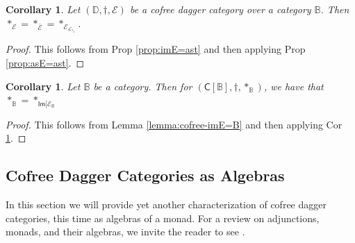 \documentclass[10pt]{article}
\newtheorem{corollary}[observation]{Corollary}
\begin{document}
\begin{corollary}\label{cor:astE=3} Let $(\mathbb{D},\dagger, \mathcal{E})$ be a cofree dagger category over a category $\mathbb{B}$. Then $\ast_\mathcal{E} = \ast_{\overline{\mathcal{E}}} = \ast_{\mathcal{E}_{\mathcal{L}_{\ast_\mathcal{E}}}}$. 
\end{corollary}
\begin{proof} This follows from Prop \ref{prop:imE=ast} and then applying Prop \ref{prop:asE=ast}. 
\end{proof}

\begin{corollary}\label{cor:astE=3-canon} Let $\mathbb{B}$ be a category. Then for $(\mathsf{C}[\mathbb{B}], \dagger, \ast_\mathbb{B})$, we have that $\ast_\mathbb{B} = \ast_{\mathsf{Im}[\mathcal{E}_\mathbb{B}}$
\end{corollary}
\begin{proof} This follows from Lemma \ref{lemma:cofree-imE=B} and then applying Cor \ref{cor:astE=3}. 
\end{proof}

\subsection{Cofree Dagger Categories as Algebras}\label{sec:alg}

In this section we will provide yet another characterization of cofree dagger categories, this time as algebras of a monad. For a review on adjunctions, monads, and their algebras, we invite the reader to see \cite{mac1971categories}. 
\end{document}
